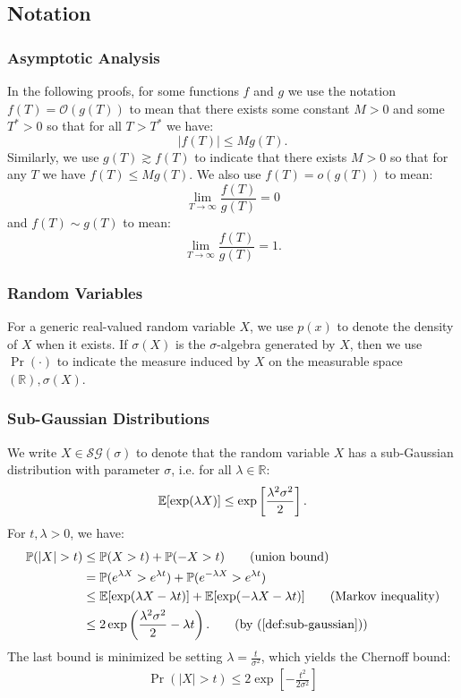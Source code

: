 \subsection{Notation}
\label{app:notation}

\subsubsection{Asymptotic Analysis} 

In the following proofs, for some functions $f$ and $g$ we use the notation $f(T) = \mathcal{O}(g(T))$ to mean that there exists some constant $M > 0$ and some $T^* > 0$ so that for all $T > T^*$ we have: $$|f(T)| \leq M g(T).$$ Similarly, we use $g(T) \gtrsim f(T)$ to indicate that there exists $M > 0$ so that for any $T$ we have $f(T) \leq M g(T).$ We also use $f(T) = o(g(T))$ to mean:$$\lim_{T\to\infty} \frac{f(T)}{g(T)} = 0$$ and $f(T) \sim g(T)$ to mean: $$\lim_{T\to\infty} \frac{f(T)}{g(T)} = 1.$$ 

\subsubsection{Random Variables} 

For a generic real-valued random variable $X$, we use $p(x)$ to denote the density of $X$ when it exists. If $\sigma(X)$ is the $\sigma$-algebra generated by $X$, then we use $\Pr(\cdot)$ to indicate the measure induced by $X$ on the measurable space $(\mathbb{R}),\sigma(X)$.

\subsubsection{Sub-Gaussian Distributions}

We write $X\in\mathcal{SG}(\sigma)$ to denote that the random variable $X$ has a sub-Gaussian distribution with parameter $\sigma$, i.e. for all $\lambda \in \mathbb{R}$: 
\begin{align} 
    \mathbb{E}[\exp(\lambda X)] \leq \exp\left[\frac{\lambda^2\sigma^2}{2}\right]. \label{def:sub-gaussian}
\end{align}
For $t, \lambda > 0$, we have:
\begin{align}
     \Pr(|X| > t) &\leq \Pr(X > t) + \Pr(-X > t) \tag{union bound} \\
     &= \Pr(e^{\lambda X} > e^{\lambda t}) + \Pr(e^{-\lambda X} > e^{\lambda t}) \notag \\
     &\leq \E[\exp(\lambda X - \lambda t)] + \E[\exp(-\lambda X - \lambda t)] \tag{Markov inequality} \\
     &\leq 2\exp\left(\frac{\lambda^2\sigma^2}{2} - \lambda t\right). \tag{by (\ref{def:sub-gaussian})} 
\end{align}
The last bound is minimized be setting $\lambda = \frac{t}{\sigma^2}$, which yields the Chernoff bound:
\begin{align} \label{eq:chernoff}
    \Pr(|X| > t) \leq 2\exp\left[-\frac{t^2}{2\sigma^2}\right]
\end{align}

